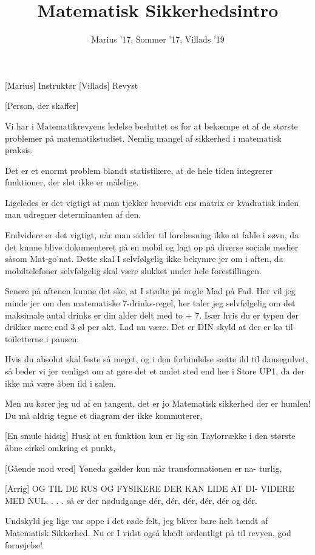 \documentclass[a4paper,11pt]{article}
\title{Matematisk Sikkerhedsintro}
\author{Marius '17, Sommer '17, Villads '19}
\begin{document}
\maketitle

\begin{roles}
[Marius] Instruktør
[Villads] Revyst
\end{roles}

\begin{props}
[Person, der skaffer]
\end{props}


\begin{sketch}

 Vi har i Matematikrevyens ledelse besluttet os for at bekæmpe et af de største problemer på matematikstudiet. Nemlig mangel af sikkerhed i matematisk praksis.

 Det er et enormt problem blandt statistikere, at de hele tiden integrerer funktioner, der slet ikke er målelige.

 Ligeledes er det vigtigt at man tjekker hvorvidt ens matrix er kvadratisk inden man udregner determinanten af den.

 Endvidere er det vigtigt, når man sidder til forelæsning ikke at falde i søvn, da det kunne blive dokumenteret på en mobil og lagt op på diverse sociale medier såsom Mat-go'nat. Dette skal I selvfølgelig ikke bekymre jer om i aften, da mobiltelefoner selvfølgelig skal være slukket under hele forestillingen.

 Senere på aftenen kunne det ske, at I stødte på nogle Mad på Fad. Her vil jeg minde jer om den matematiske 7-drinks-regel, her taler jeg selvfølgelig om det maksimale antal drinks er din alder delt med to + 7. Især hvis du er typen der drikker mere end 3 øl per akt. Lad nu være. Det er DIN skyld at der er kø til toiletterne i pausen.

 Hvis du absolut skal feste så meget, og i den forbindelse sætte ild til dansegulvet, så beder vi jer venligst om at gøre det et andet sted end her i Store UP1, da der ikke må være åben ild i salen.

 Men nu kører jeg ud af en tangent, det er jo Matematisk sikkerhed der er humlen! Du må aldrig tegne et diagram der ikke kommuterer,

[En smule hidsig] Husk at en funktion kun er lig sin Taylorrække i den største åbne cirkel omkring et punkt,

[Gående mod vred] Yoneda gælder kun når transformationen er na- turlig,

[Arrig] OG TIL DE RUS OG FYSIKERE DER KAN LIDE AT DI- VIDERE MED NUL. . . .  så er der nødudgange dér, dér, dér, dér, dér og dér.

 Undskyld jeg lige var oppe i det røde felt, jeg bliver bare helt tændt af Matematisk Sikkerhed. Nu er I vidst også klædt ordentligt på til revyen, god fornøjelse!

\end{sketch}
\end{document}
